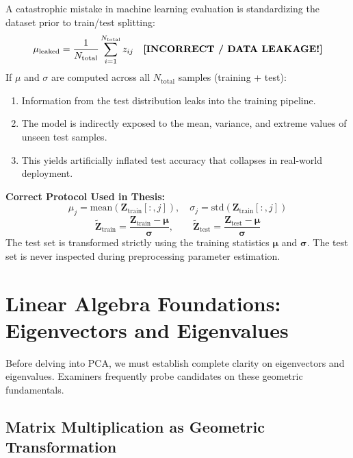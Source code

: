 \documentclass[11pt, a4paper]{article}
\begin{document}
\begin{warningbox}
A catastrophic mistake in machine learning evaluation is standardizing the dataset prior to train/test splitting:
$$\mu_{\text{leaked}} = \frac{1}{N_{\text{total}}} \sum_{i=1}^{N_{\text{total}}} z_{ij} \quad \text{\textbf{[INCORRECT / DATA LEAKAGE!]}}$$
If $\mu$ and $\sigma$ are computed across all $N_{\text{total}}$ samples (training + test):
\begin{enumerate}[leftmargin=1.2em]
    \item Information from the test distribution leaks into the training pipeline.
    \item The model is indirectly exposed to the mean, variance, and extreme values of unseen test samples.
    \item This yields artificially inflated test accuracy that collapses in real-world deployment.
\end{enumerate}
\textbf{Correct Protocol Used in Thesis:}
$$\mu_j = \text{mean}(\mathbf{Z}_{\text{train}}[:, j]), \quad \sigma_j = \text{std}(\mathbf{Z}_{\text{train}}[:, j])$$
$$\tilde{\mathbf{Z}}_{\text{train}} = \frac{\mathbf{Z}_{\text{train}} - \boldsymbol{\mu}}{\boldsymbol{\sigma}}, \qquad \tilde{\mathbf{Z}}_{\text{test}} = \frac{\mathbf{Z}_{\text{test}} - \boldsymbol{\mu}}{\boldsymbol{\sigma}}$$
The test set is transformed strictly using the training statistics $\boldsymbol{\mu}$ and $\boldsymbol{\sigma}$. The test set is never inspected during preprocessing parameter estimation.
\end{warningbox}

\clearpage

\section{Linear Algebra Foundations: Eigenvectors and Eigenvalues}

Before delving into PCA, we must establish complete clarity on eigenvectors and eigenvalues. Examiners frequently probe candidates on these geometric fundamentals.

\subsection{Matrix Multiplication as Geometric Transformation}
\end{document}

